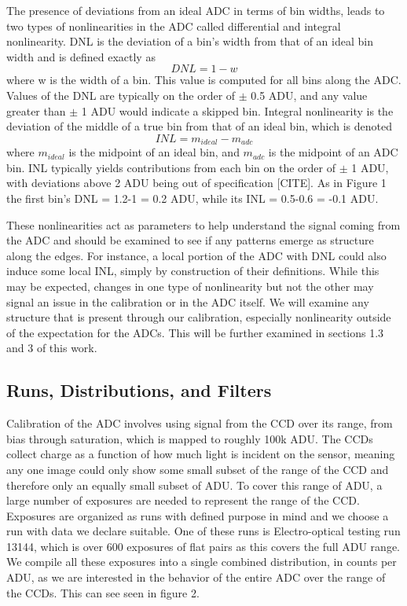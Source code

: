 \documentclass[11pt, letterpaper]{article}
\begin{document}
The presence of deviations from an ideal ADC in terms of bin widths, leads to two types of nonlinearities in the ADC called differential and integral nonlinearity. 
DNL is the deviation of a bin's width from that of an ideal bin width and is defined exactly as
\begin{equation}\label{}
DNL =1- w  
\end{equation}
where w is the width of a bin. 
This value is computed for all bins along the ADC. 
Values of the DNL are typically on the order of $\pm$ 0.5 ADU, and any value greater than $\pm$ 1 ADU would indicate a skipped bin. 
Integral nonlinearity is the deviation of the middle of a true bin from that of an ideal bin, which is denoted 
\begin{equation}\label{}
INL = m_{ideal} - m_{adc} 
\end{equation}
where $m_{ideal}$ is the midpoint of an ideal bin, and $m_{adc}$ is the midpoint of an ADC bin. 
INL typically yields contributions from each bin on the order of $\pm$ 1 ADU, with deviations above 2 ADU being out of specification [CITE]. 
As in Figure 1 the first bin's DNL = 1.2-1 = 0.2 ADU, while its INL = 0.5-0.6 = -0.1 ADU. 
\indent


These nonlinearities act as parameters to help understand the signal coming from the ADC and should be examined to see if any patterns emerge as structure along the edges. 
For instance, a local portion of the ADC with DNL could also induce some local INL, simply by construction of their definitions.
While this may be expected, changes in one type of nonlinearity but not the other may signal an issue in the calibration or in the ADC itself.
We will examine any structure that is present through our calibration, especially nonlinearity outside of the expectation for the ADCs. 
This will be further examined in sections 1.3 and 3 of this work.


\subsection{Runs, Distributions, and Filters}
\indent

Calibration of the ADC involves using signal from the CCD over its range, from bias through saturation, which is mapped to roughly 100k ADU. 
The CCDs collect charge as a function of how much light is incident on the sensor, meaning any one image could only show some small subset of the range of the CCD and therefore only an equally small subset of ADU.
To cover this range of ADU, a large number of exposures are needed to represent the range of the CCD. 
Exposures are organized as runs with defined purpose in mind and we choose a run with data we declare suitable. 
One of these runs is Electro-optical testing run 13144, which is over 600 exposures of flat pairs as this covers the full ADU range. 
We compile all these exposures into a single combined distribution, in counts per ADU, as we are interested in the behavior of the entire ADC over the range of the CCDs. 
This can see seen in figure 2. 
\end{document}
